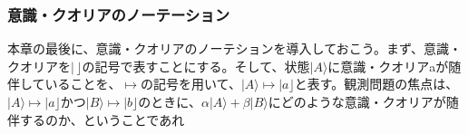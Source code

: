 \subsubsection{意識・クオリアのノーテーション}
本章の最後に、意識・クオリアのノーテションを導入しておこう。まず、意識・クオリアを$|\,\rfloor$の記号で表すことにする。そして、状態$|A\rangle$に意識・クオリアaが随伴していることを、$\mapsto$の記号を用いて、$|A\rangle \mapsto |a \rfloor$と表す。観測問題の焦点は、$|A\rangle \mapsto |a \rfloor$かつ$|B\rangle \mapsto |b \rfloor$のときに、$\alpha|A\rangle + \beta|B\rangle$にどのような意識・クオリアが随伴するのか、ということであれ
